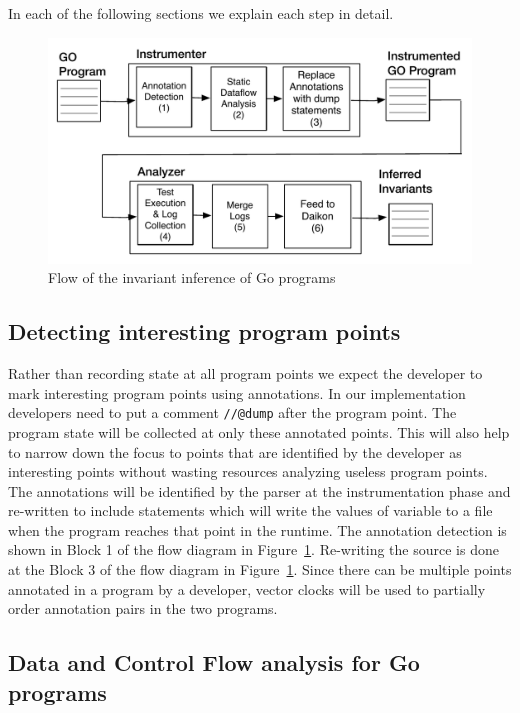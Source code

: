 In each of the following sections we explain each step in detail.
\begin{figure}
  \includegraphics[width=\columnwidth]{go_flow.pdf}
  \caption{Flow of the invariant inference of Go programs}
  \label{fig:go_flow}
\end{figure}



\subsection{Detecting interesting program points}

Rather than recording state at all program points we expect the
developer to mark interesting program points using annotations. In our implementation developers need to put a comment \texttt{//@dump} after the program point. The
program state will be collected at only these annotated points. This will
also help to narrow down the focus to points that are identified by
the developer as interesting points without wasting resources
analyzing useless program points. The annotations will be identified
by the parser at the instrumentation phase and re-written to include
statements which will write the values of variable to a file when the
program reaches that point in the runtime. The annotation detection is shown in Block 1 of the flow diagram in Figure~\ref{fig:go_flow}. Re-writing the source is done at the Block 3 of the flow diagram in Figure~\ref{fig:go_flow}. Since there can be multiple points annotated in a program by a
developer, vector clocks will be used to partially order annotation
pairs in the two programs.%

\subsection{Data and Control Flow analysis for Go programs}

